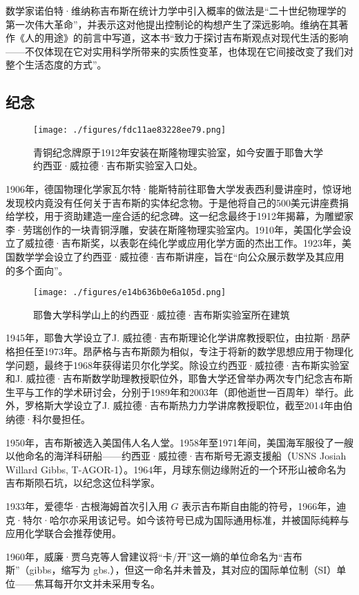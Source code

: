 数学家诺伯特·维纳称吉布斯在统计力学中引入概率的做法是“二十世纪物理学的第一次伟大革命”，并表示这对他提出控制论的构想产生了深远影响。维纳在其著作《人的用途》的前言中写道，这本书“致力于探讨吉布斯观点对现代生活的影响——不仅体现在它对实用科学所带来的实质性变革，也体现在它间接改变了我们对整个生活态度的方式”。
\subsection{纪念}
\begin{figure}[ht]
\centering
\texttt{[image: ./figures/fdc11ae83228ee79.png]}
\caption{青铜纪念牌原于1912年安装在斯隆物理实验室，如今安置于耶鲁大学约西亚·威拉德·吉布斯实验室入口处。} \label{fig_QSY_13}
\end{figure}
1906年，德国物理化学家瓦尔特·能斯特前往耶鲁大学发表西利曼讲座时，惊讶地发现校内竟没有任何关于吉布斯的实体纪念物。于是他将自己的500美元讲座费捐给学校，用于资助建造一座合适的纪念碑。这一纪念最终于1912年揭幕，为雕塑家李·劳瑞创作的一块青铜浮雕，安装在斯隆物理实验室内。1910年，美国化学会设立了威拉德·吉布斯奖，以表彰在纯化学或应用化学方面的杰出工作。1923年，美国数学学会设立了约西亚·威拉德·吉布斯讲座，旨在“向公众展示数学及其应用的多个面向”。
\begin{figure}[ht]
\centering
\texttt{[image: ./figures/e14b636b0e6a105d.png]}
\caption{耶鲁大学科学山上的约西亚·威拉德·吉布斯实验室所在建筑} \label{fig_QSY_14}
\end{figure}
1945年，耶鲁大学设立了J. 威拉德·吉布斯理论化学讲席教授职位，由拉斯·昂萨格担任至1973年。昂萨格与吉布斯颇为相似，专注于将新的数学思想应用于物理化学问题，最终于1968年获得诺贝尔化学奖。除设立约西亚·威拉德·吉布斯实验室和J. 威拉德·吉布斯数学助理教授职位外，耶鲁大学还曾举办两次专门纪念吉布斯生平与工作的学术研讨会，分别于1989年和2003年（即他逝世一百周年）举行。此外，罗格斯大学设立了J. 威拉德·吉布斯热力力学讲席教授职位，截至2014年由伯纳德·科尔曼担任。

1950年，吉布斯被选入美国伟人名人堂。1958年至1971年间，美国海军服役了一艘以他命名的海洋科研船——约西亚·威拉德·吉布斯号无源支援船（USNS Josiah Willard Gibbs, T-AGOR-1）。1964年，月球东侧边缘附近的一个环形山被命名为吉布斯陨石坑，以纪念这位科学家。

1933年，爱德华·古根海姆首次引入用 $G$ 表示吉布斯自由能的符号，1966年，迪克·特尔·哈尔亦采用该记号。如今该符号已成为国际通用标准，并被国际纯粹与应用化学联合会推荐使用。

1960年，威廉·贾乌克等人曾建议将“卡/开”这一熵的单位命名为“吉布斯”（gibbs，缩写为 gbs.），但这一命名并未普及，其对应的国际单位制（SI）单位——焦耳每开尔文并未采用专名。

